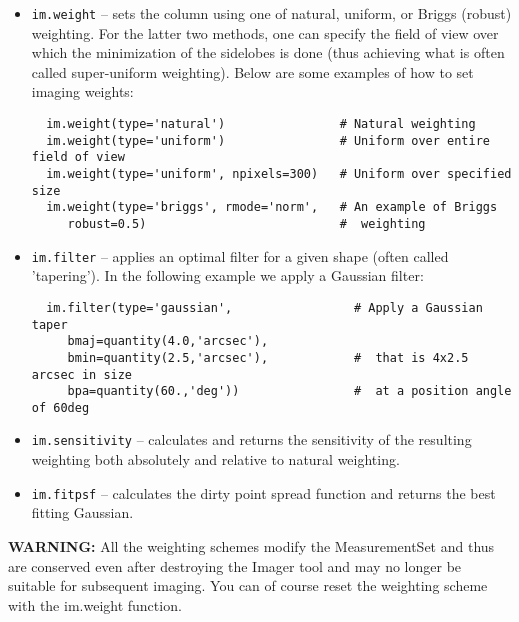 \begin{itemize}
   \item {\tt im.weight} -- sets the column using one of natural,
          uniform, or Briggs (robust) weighting.  For the latter two
          methods, one can specify the field of view over which the
          minimization of the sidelobes is done (thus achieving what
          is often called super-uniform weighting).  Below are some
          examples of how to set imaging weights:

\small
\begin{verbatim}
  im.weight(type='natural')                # Natural weighting
  im.weight(type='uniform')                # Uniform over entire field of view
  im.weight(type='uniform', npixels=300)   # Uniform over specified size
  im.weight(type='briggs', rmode='norm',   # An example of Briggs
     robust=0.5)                           #  weighting
\end{verbatim}
\normalsize

   \item {\tt im.filter} -- applies an optimal filter for a given
          shape (often called 'tapering'). In the following example we
          apply a Gaussian filter:

\small
\begin{verbatim}
  im.filter(type='gaussian',                 # Apply a Gaussian taper
     bmaj=quantity(4.0,'arcsec'),
     bmin=quantity(2.5,'arcsec'),            #  that is 4x2.5 arcsec in size
     bpa=quantity(60.,'deg'))                #  at a position angle of 60deg
\end{verbatim}
\normalsize


   \item {\tt im.sensitivity} -- calculates and returns the
          sensitivity of the resulting weighting both absolutely and relative
          to natural weighting. 

   \item {\tt im.fitpsf} -- calculates the dirty point spread function
         and returns the best fitting Gaussian. 
\end{itemize}

{\bf WARNING:} All the weighting schemes modify the MeasurementSet and
thus are conserved even after destroying the Imager tool and may no
longer be suitable for subsequent imaging.  You can of course reset
the weighting scheme with the im.weight function.

